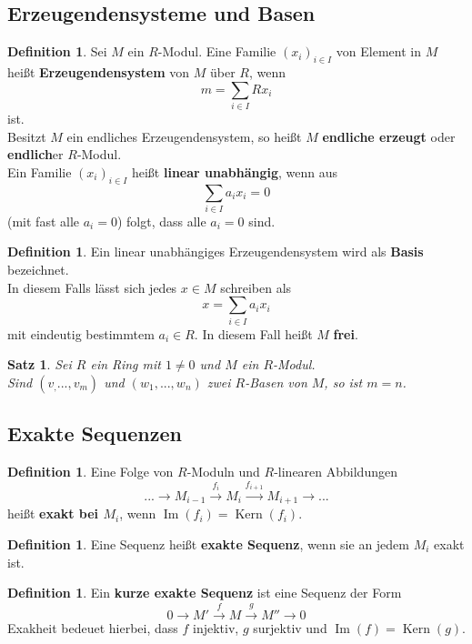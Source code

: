 \documentclass[10pt,a4paper]{article}
\newcommand{\Kern}{\operatorname{Kern}}
\newcommand{\Img}{\operatorname{Im}}
\theoremstyle{plain}
\newtheorem{satz}[theorem]{Satz}
\theoremstyle{definition}
\newtheorem{definition}[theorem]{Definition}
\theoremstyle{remark}
\begin{document}
	\subsection{Erzeugendensysteme und Basen}
	\begin{definition}
		Sei $M$ ein $R$-Modul. Eine Familie $(x_i)_{i\in I}$ von Element in $M$ heißt \textbf{Erzeugendensystem} von $M$ über $R$, wenn
		\[m=\sum_{i\in I}Rx_i\]
		ist.\\
		Besitzt $M$ ein endliches Erzeugendensystem, so heißt $M$ \textbf{endliche erzeugt} oder \textbf{endlich}er $R$-Modul.\\
		Ein Familie $(x_i)_{i\in I}$ heißt \textbf{linear unabhängig}, wenn aus
		\[\sum_{i\in I}a_ix_i=0\]
		(mit fast alle $a_i=0$) folgt, dass alle $a_i=0$ sind.
	\end{definition}
	\begin{definition}
		Ein linear unabhängiges Erzeugendensystem wird als \textbf{Basis} bezeichnet.\\
		In diesem Falls lässt sich jedes $x\in M$ schreiben als
		\[x=\sum_{i\in I}a_ix_i\]
		mit eindeutig bestimmtem $a_i\in R$. In diesem Fall heißt $M$ \textbf{frei}.
	\end{definition}

	\begin{satz}
		Sei $R$ ein Ring mit $1\neq 0$ und $M$ ein $R$-Modul.\\
		Sind $(v_,...,v_m)$ und $(w_1,...,w_n)$ zwei $R$-Basen von $M$, so ist $m=n$.
	\end{satz}

	\subsection{Exakte Sequenzen}
	\begin{definition}
		Eine Folge von $R$-Moduln und $R$-linearen Abbildungen
		\[...\to M_{i-1}\xrightarrow{f_i}M_i\xrightarrow{f_{i+1}}M_{i+1}\to...\]
		heißt \textbf{exakt bei $M_i$}, wenn  $\Img(f_i)=\Kern(f_i)$.
	\end{definition}
	
	\begin{definition}
		Eine Sequenz heißt \textbf{exakte Sequenz}, wenn sie an jedem $M_i$ exakt ist.
	\end{definition}

	\begin{definition}
		Ein \textbf{kurze exakte Sequenz} ist eine Sequenz der Form
		\[0\to M'\xrightarrow{f}M\xrightarrow{g}M''\to 0\]
		Exakheit bedeuet hierbei, dass $f$ injektiv, $g$ surjektiv und $\Img(f)=\Kern(g)$.
	\end{definition}
\end{document}

